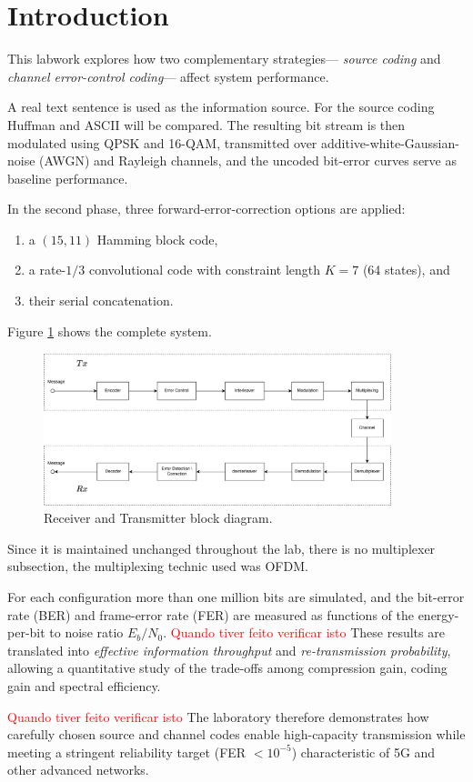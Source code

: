 \section{Introduction}

This labwork explores how two complementary strategies—
\emph{source coding} and \emph{channel error-control coding}—
affect system performance.

A real text sentence is used as the information source.
For the source coding Huffman and ASCII will be compared.
The resulting bit stream is then modulated using QPSK and 16-QAM,
transmitted over additive-white-Gaussian-noise (AWGN) and Rayleigh channels,
and the uncoded bit-error curves serve as baseline performance.

In the second phase, three forward-error-correction options are applied:  
\begin{enumerate}
  \item a $(15,11)$ Hamming block code,
  \item a rate-$1/3$ convolutional code with constraint length $K=7$ (64 states), and
  \item their serial concatenation.
\end{enumerate}

 Figure \ref{fig:RxTx} shows the complete system.

\begin{figure}[H]
  \centering
  \includegraphics[width=0.9\textwidth]{Images/BlockDiagram.png}
  \caption{Receiver and Transmitter block diagram.}
  \label{fig:RxTx}
\end{figure}

Since it is maintained unchanged throughout the lab, there is no multiplexer subsection, the multiplexing technic used was OFDM.  

For each configuration more than one million bits are simulated, and the
bit-error rate (BER) and frame-error rate (FER) are measured as functions
of the energy-per-bit to noise ratio $E_b/N_0$.  
\textcolor{red}{Quando tiver feito verificar isto}
These results are translated into \emph{effective information throughput}
and \emph{re-transmission probability}, allowing a quantitative study of
the trade-offs among compression gain, coding gain and spectral efficiency.

\textcolor{red}{Quando tiver feito verificar isto}
The laboratory therefore demonstrates how carefully chosen source and
channel codes enable high-capacity transmission while meeting a stringent
reliability target (FER $<10^{-5}$) characteristic of 5G and other
advanced networks.
